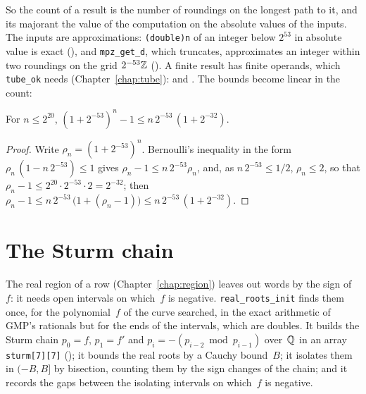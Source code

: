 So the count of a result is the number of roundings on the longest path to it, and its majorant the
value of the computation on the absolute values of the inputs. The inputs are approximations:
\texttt{(double)n} of an integer below $2^{53}$ in absolute value is exact
(), and \texttt{mpz\_get\_d}, which truncates, approximates an
integer within two roundings on the grid $2^{-53}\mathbb{Z}$ (). A
finite result has finite operands, which \texttt{tube\_ok} needs (Chapter~\ref{chap:tube}):
 and
. The bounds become linear in the count:

\begin{lemma}\label{lem:one_add_pow_sub_one_le}
  \leanok
  For $n \le 2^{20}$, $(1 + 2^{-53})^n - 1 \le n\,2^{-53}\,(1 + 2^{-32})$.
\end{lemma}

\begin{proof}
  \leanok
  Write $\rho_n = (1 + 2^{-53})^n$. Bernoulli's inequality in the form
  $\rho_n\,(1 - n\,2^{-53}) \le 1$ gives $\rho_n - 1 \le n\,2^{-53}\rho_n$, and, as
  $n\,2^{-53} \le 1/2$, $\rho_n \le 2$, so that
  $\rho_n - 1 \le 2^{20} \cdot 2^{-53} \cdot 2 = 2^{-32}$; then
  $\rho_n - 1 \le n\,2^{-53}\,\bigl(1 + (\rho_n - 1)\bigr) \le n\,2^{-53}\,(1 + 2^{-32})$.
\end{proof}

\section{The Sturm chain}\label{sec:sturmChain}

The real region of a row (Chapter~\ref{chap:region}) leaves out words by the sign of~$f$: it needs
open intervals on which~$f$ is negative. \texttt{real\_roots\_init} finds them once, for the
polynomial~$f$ of the curve searched, in the exact arithmetic of GMP's rationals but for the ends
of the intervals, which are doubles. It builds the Sturm chain
$p_0 = f$, $p_1 = f'$ and $p_i = -(p_{i-2} \bmod p_{i-1})$ over~$\mathbb{Q}$ in an array
\texttt{sturm[7][7]} (); it bounds the real roots by a Cauchy
bound~$B$; it isolates them in $(-B, B]$ by bisection, counting them by the sign changes of the
chain; and it records the gaps between the isolating intervals on which~$f$ is negative.

